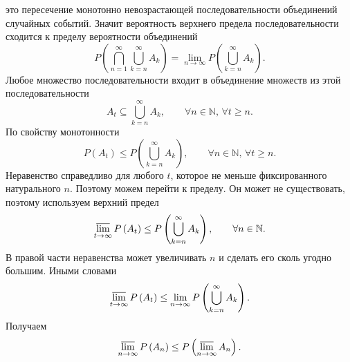 \begin{enumerate}[label=\alph*)]
это пересечение монотонно невозрастающей последовательности объединений случайных событий.
Значит вероятность верхнего предела последовательности сходится к пределу вероятности объединений
$$P \left( \bigcap \limits_{n=1}^{ \infty } \bigcup \limits_{k=n}^{ \infty } A_k \right) =
\lim \limits_{n \rightarrow \infty } P \left( \bigcup \limits_{k=n}^{ \infty } A_k \right).$$
Любое множество последовательности входит в объединение множеств из этой последовательности
$$A_t \subseteq \bigcup \limits_{k=n}^{ \infty } A_k, \qquad
\forall n \in \mathbb{N}, \,
\forall t \geq n.$$
По свойству монотонности
$$P \left( A_t \right) \leq
P \left( \bigcup \limits_{k=n}^{ \infty } A_k \right), \qquad
\forall n \in \mathbb{N}, \,
\forall t \geq n.$$
Неравенство справедливо для любого $t$, которое не меньше фиксированного натурального $n$.
Поэтому можем перейти к пределу.
Он может не существовать, поэтому используем верхний предел
$$ \varlimsup \limits_{t \rightarrow \infty } P \left( A_t \right) \leq
P \left( \bigcup \limits_{k=n}^{ \infty } A_k \right), \qquad
\forall n \in \mathbb{N}.$$
В правой части неравенства может увеличивать $n$ и сделать его сколь угодно большим.
Иными словами
$$ \varlimsup \limits_{t \rightarrow \infty } P\left( A_t \right) \leq
\lim \limits_{n \rightarrow \infty }P \left( \bigcup \limits_{k=n}^{ \infty } A_k \right).$$
Получаем
$$ \varlimsup \limits_{n \rightarrow \infty } P \left( A_n \right) \leq
P \left( \varlimsup \limits_{n \rightarrow \infty } A_n \right).$$
\end{enumerate}
